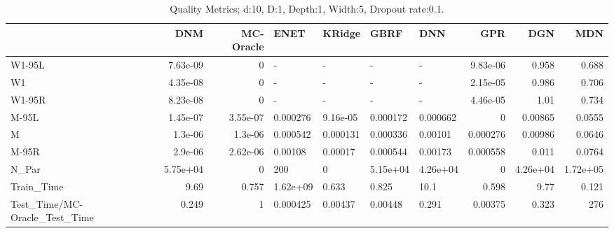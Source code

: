 \begin{table}
\centering
\caption{Quality Metrics; d:10, D:1, Depth:1, Width:5, Dropout rate:0.1.}
\begin{tabular}{lrrllllrrr}
\toprule
{} &      DNM &  MC-Oracle &     ENET &   KRidge &     GBRF &      DNN &      GPR &      DGN &      MDN \\
\midrule
W1-95L                        & 7.63e-09 &          0 &        - &        - &        - &        - & 9.83e-06 &    0.958 &    0.688 \\
W1                            & 4.35e-08 &          0 &        - &        - &        - &        - & 2.15e-05 &    0.986 &    0.706 \\
W1-95R                        & 8.23e-08 &          0 &        - &        - &        - &        - & 4.46e-05 &     1.01 &    0.734 \\
M-95L                         & 1.45e-07 &   3.55e-07 & 0.000276 & 9.16e-05 & 0.000172 & 0.000662 &        0 &  0.00865 &   0.0555 \\
M                             &  1.3e-06 &    1.3e-06 & 0.000542 & 0.000131 & 0.000336 &  0.00101 & 0.000276 &  0.00986 &   0.0646 \\
M-95R                         &  2.9e-06 &   2.62e-06 &  0.00108 &  0.00017 & 0.000544 &  0.00173 & 0.000558 &    0.011 &   0.0764 \\
N\_Par                         & 5.75e+04 &          0 &      200 &        0 & 5.15e+04 & 4.26e+04 &        0 & 4.26e+04 & 1.72e+05 \\
Train\_Time                    &     9.69 &      0.757 & 1.62e+09 &    0.633 &    0.825 &     10.1 &    0.598 &     9.77 &    0.121 \\
Test\_Time/MC-Oracle\_Test\_Time &    0.249 &          1 & 0.000425 &  0.00437 &  0.00448 &    0.291 &  0.00375 &    0.323 &      276 \\
\bottomrule
\end{tabular}
\end{table}
